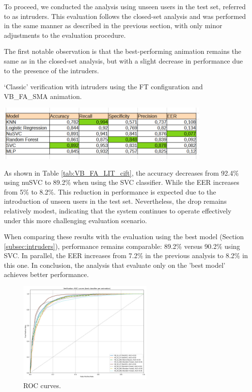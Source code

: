 \documentclass[12pt]{report}
\begin{document}
To proceed, we conducted the analysis using unseen users in the test set, referred to as intruders. 
This evaluation follows the closed-set analysis and was performed in the same manner as described in the previous section, with only minor adjustments to the evaluation procedure.

The first notable observation is that the best-performing animation remains the same as in the closed-set analysis, but with a slight decrease in performance due to the presence of the intruders.

\begin{table}[ht]
    \centering
    \caption{‘Classic’ verification with intruders using the FT configuration and VB\_FA\_SMA animation.}
    \includegraphics[width=0.8\textwidth]{Images/Results/Classic_procedure/Verification_intruders/ft/VB_FA_LIT.png}
    \label{tab:VB_FA_LIT_cift}
\end{table}

As shown in Table \ref{tab:VB_FA_LIT_cift}, the accuracy decreases from 92.4\% using nuSVC to 89.2\% when using the SVC classifier.
While the EER increases from 5\% to 8.2\%. 
This reduction in performance is expected due to the introduction of unseen users in the test set. 
Nevertheless, the drop remains relatively modest, indicating that the system continues to operate effectively under this more challenging evaluation scenario.

When comparing these results with the evaluation using the best model (Section \ref{subsec:intruders}), performance remains comparable: 89.2\% versus 90.2\% using SVC. 
In parallel, the EER increases from 7.2\% in the previous analysis to 8.2\% in this one.
In conclusion, the analysis that evaluate only on the 'best model' achieves better performance.

\begin{figure}[ht]
\centering
\includegraphics[width=0.6\textwidth]{Images/Results/Classic_procedure/Verification_intruders/ft/Verification_single_intruders_roc_two_ft.png}
\caption{ROC curves.}
\label{fig:roc_cift}
\end{figure}
\end{document}
